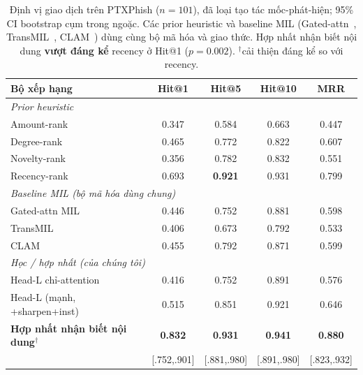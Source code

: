 \documentclass[conference]{IEEEtran}
\newcommand{\best}[1]{\textbf{#1}}
\begin{document}
\begin{table}[t]\centering\caption{Định vị giao dịch trên PTXPhish ($n{=}101$), đã
loại tạo tác mốc-phát-hiện; 95\% CI bootstrap cụm trong ngoặc. Các prior heuristic
và baseline MIL (Gated-attn~\cite{ilse2018}, TransMIL~\cite{transmil},
CLAM~\cite{clam}) dùng cùng bộ mã hóa và giao thức. Hợp nhất nhận biết nội dung
\best{vượt đáng kể} recency ở Hit@1 ($p{=}0.002$). $^\dagger$cải thiện đáng kể so
với recency.}\label{tab:loc}
\begin{tabular}{lcccc}\toprule
\textbf{Bộ xếp hạng} & \textbf{Hit@1} & \textbf{Hit@5} & \textbf{Hit@10} & \textbf{MRR} \\\midrule
\multicolumn{5}{l}{\emph{Prior heuristic}}\\
Amount-rank & 0.347 & 0.584 & 0.663 & 0.447 \\
Degree-rank & 0.465 & 0.772 & 0.822 & 0.607 \\
Novelty-rank & 0.356 & 0.782 & 0.832 & 0.551 \\
Recency-rank & 0.693 & \best{0.921} & 0.931 & 0.799 \\
\midrule\multicolumn{5}{l}{\emph{Baseline MIL (bộ mã hóa dùng chung)}}\\
Gated-attn MIL~\cite{ilse2018} & 0.446 & 0.752 & 0.881 & 0.598 \\
TransMIL~\cite{transmil} & 0.406 & 0.673 & 0.792 & 0.533 \\
CLAM~\cite{clam} & 0.455 & 0.792 & 0.871 & 0.599 \\
\midrule\multicolumn{5}{l}{\emph{Học / hợp nhất (của chúng tôi)}}\\
Head-L chỉ-attention & 0.416 & 0.752 & 0.891 & 0.576 \\
Head-L (mạnh, +sharpen+inst) & 0.515 & 0.851 & 0.921 & 0.646 \\
\textbf{Hợp nhất nhận biết nội dung}$^\dagger$ & \best{0.832} & \best{0.931} & \best{0.941} & \best{0.880} \\
& \footnotesize[.752,.901] & \footnotesize[.881,.980] & \footnotesize[.891,.980] & \footnotesize[.823,.932] \\
\bottomrule\end{tabular}\end{table}
\end{document}

